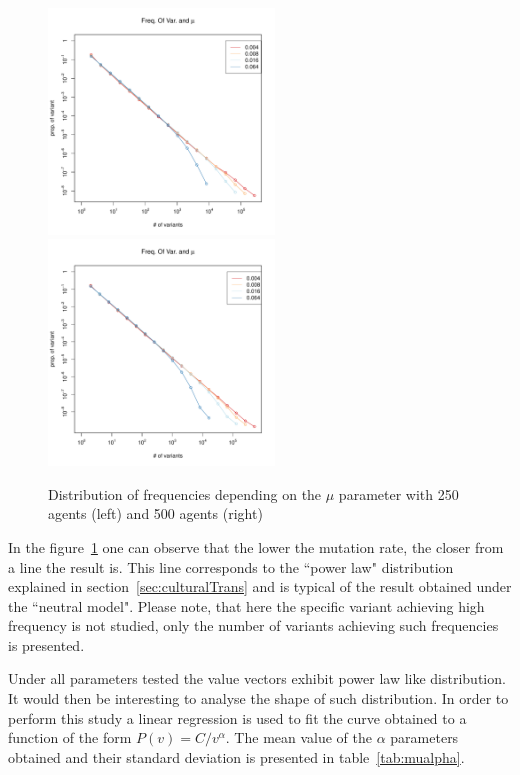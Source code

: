 \documentclass{wscpaperproc}
\begin{document}
\begin{figure}[!hbp]
	\begin{center}
		\includegraphics[width=6cm]{img/allmuRandMaxN250.pdf}
		\includegraphics[width=6cm]{img/allmuRandMaxN500.pdf}
	\end{center}
	\caption{Distribution of frequencies depending on the $\mu$ parameter with 250 agents (left) and 500 agents (right)\label{fig:allMutation}}
\end{figure}

In the figure~\ref{fig:allMutation} one can observe that the lower the mutation rate, the closer from a line the result is. This line corresponds to the ``power law" distribution explained in section~\ref{sec:culturalTrans} and is typical of the result obtained under the ``neutral model". Please note, that here the specific variant achieving high frequency is not studied, only the number of variants achieving such frequencies is presented.  

Under all parameters tested the value vectors exhibit power law like distribution. It would then be interesting to analyse the shape of such distribution. In order to perform this study a linear regression is used to fit the curve obtained to a function of the form $P(v)=C/v^\alpha $. The mean value of the $\alpha$ parameters obtained and their standard deviation is presented in table~\ref{tab:mualpha}.
\end{document}
